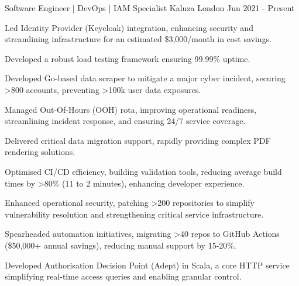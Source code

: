 

\begin{cventries}

\cventry
    {Software Engineer | DevOps | IAM Specialist} %
    {Kaluza} %
    {London} %
    {Jun 2021 - Present} %
    {
      \begin{cvitems} %
        \item {Led Identity Provider (Keycloak) integration, enhancing security and streamlining infrastructure for an estimated \$3,000/month in cost savings.}
        \item {Developed a robust load testing framework ensuring 99.99\% uptime.}
        \item {Developed Go-based data scraper to mitigate a major cyber incident, securing >800 accounts, preventing >100k user data exposures.}
        \item {Managed Out-Of-Hours (OOH) rota, improving operational readiness, streamlining incident response, and ensuring 24/7 service coverage.}
        \item {Delivered critical data migration support, rapidly providing complex PDF rendering solutions.}
        \item {Optimised CI/CD efficiency, building validation tools, reducing average build times by >80\% (11 to 2 minutes), enhancing developer experience.}
        \item {Enhanced operational security, patching >200 repositories to simplify vulnerability resolution and strengthening critical service infrastructure.}
        \item {Spearheaded automation initiatives, migrating >40 repos to GitHub Actions (\$50,000+ annual savings), reducing manual support by 15-20\%.}
        \item {Developed Authorisation Decision Point (Adept) in Scala, a core HTTP service simplifying real-time access queries and enabling granular control.}

\end{cvitems}}
\end{cventries}
